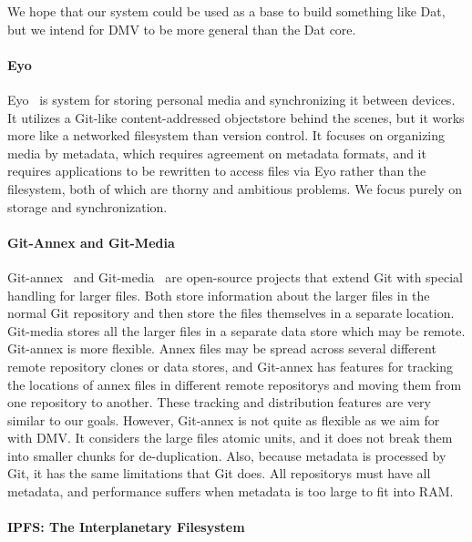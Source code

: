We hope that our system could be used as a base to build something like Dat, but we intend for \gls{DMV} to be more general than the Dat core.


\paragraph{Eyo}

Eyo~\cite{Strauss:2011:EDP:2002181.2002216} is system for storing personal media and synchronizing it between devices.
It utilizes a Git-like content-addressed \gls{objectstore} behind the scenes, but it works more like a networked filesystem than version control.
It focuses on organizing media by metadata, which requires agreement on metadata formats, and it requires applications to be rewritten to access files via Eyo rather than the filesystem, both of which are thorny and ambitious problems.
We focus purely on storage and synchronization.


\paragraph{Git-Annex and Git-Media}

Git-annex~\cite{git_annex_homepage} and Git-media~\cite{git_media_github} are open-source projects that extend Git with special handling for larger files.
Both store information about the larger files in the normal Git \gls{repository} and then store the files themselves in a separate location.
Git-media stores all the larger files in a separate data store which may be remote.
Git-annex is more flexible.
Annex files may be spread across several different remote \gls{repository} clones or data stores, and Git-annex has features for tracking the locations of annex files in different remote \glspl{repository} and moving them from one \gls{repository} to another.
These tracking and distribution features are very similar to our goals.
However, Git-annex is not quite as flexible as we aim for with \gls{DMV}.
It considers the large files atomic units, and it does not break them into smaller chunks for de-duplication.
Also, because metadata is processed by Git, it has the same limitations that Git does.
All \glspl{repository} must have all metadata, and performance suffers when metadata is too large to fit into RAM.


\paragraph{IPFS: The Interplanetary Filesystem}

